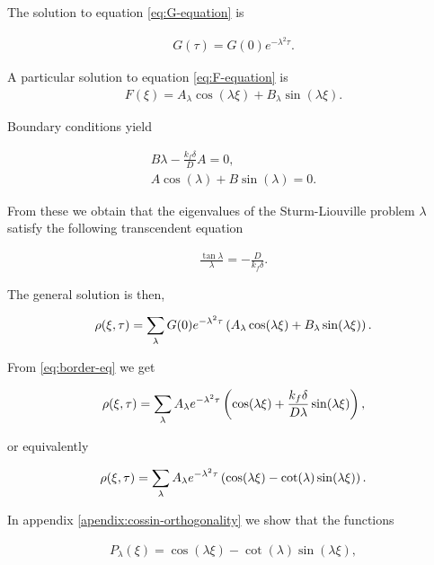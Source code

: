 The solution to equation \ref{eq:G-equation} is

\begin{align}
	G(\tau) = G(0)e^{-\lambda^2 \tau}.
\end{align}

A particular solution to equation \ref{eq:F-equation} is
\begin{align}
	F(\xi) = A_\lambda \cos(\lambda \xi) + B_\lambda \sin(\lambda\xi).
\end{align}

Boundary conditions yield

\begin{align}
	B\lambda - \frac{k_f\delta}{D}A = 0,
	\label{eq:border-eq}\\
	A \cos(\lambda) + B \sin(\lambda) = 0.
\end{align}

From these we obtain that the eigenvalues of the Sturm-Liouville problem $\lambda$ satisfy the following transcendent equation

\begin{align}
	\frac{\tan\lambda}{\lambda} = -\frac{D}{k_f\delta}.
	\label{eq:lambda-equation}
\end{align}

The general solution is then,

\begin{align}
	\rho(\xi,\tau) = \sum_\lambda G(0)e^{-\lambda^2 \tau}\left({ A_\lambda \cos(\lambda\xi) + B_\lambda \sin(\lambda\xi)}\right).
\end{align}

From \ref{eq:border-eq} we get

\begin{align}
	\rho(\xi,\tau) = \sum_\lambda A_\lambda e^{-\lambda^2 \tau}\left({  \cos(\lambda\xi) + \frac{k_f \delta}{D\lambda} \sin(\lambda\xi)}\right),
\end{align}

or equivalently

\begin{align}
	\rho(\xi,\tau) = \sum_\lambda A_\lambda e^{-\lambda^2 \tau}\left({  \cos(\lambda\xi) - \cot(\lambda)\sin(\lambda\xi)}\right).
\end{align}

In appendix \ref{apendix:cossin-orthogonality} we show that the functions 

\begin{align}
	P_\lambda(\xi) = \cos(\lambda\xi) - \cot(\lambda)\sin(\lambda\xi),
\end{align}

